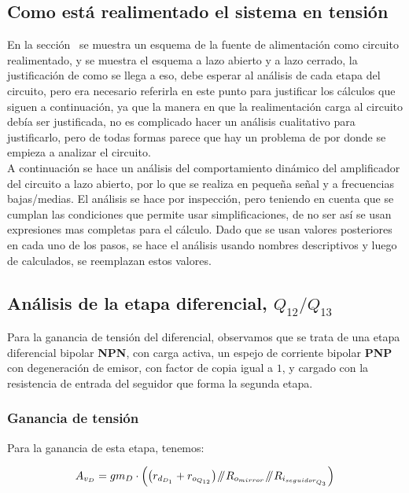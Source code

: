 
\subsection{Como está realimentado el sistema en tensión}

En la sección~ se muestra un esquema de la fuente de alimentación como circuito realimentado, y se muestra el esquema a lazo abierto y a lazo cerrado, la justificación de como se llega a eso, debe esperar al análisis de cada etapa del circuito, pero era necesario referirla en este punto para justificar los cálculos que siguen a continuación, ya que la manera en que la realimentación carga al circuito debía ser justificada, no es complicado hacer un análisis cualitativo para justificarlo, pero de todas formas parece que hay un problema de por donde se empieza a analizar el circuito.\\


A continuación se hace un análisis del comportamiento dinámico del amplificador del circuito a lazo abierto, por lo que se realiza en pequeña señal y a frecuencias bajas/medias.
El análisis se hace por inspección, pero teniendo en cuenta que se cumplan las condiciones que permite usar simplificaciones, de no ser así se usan expresiones mas completas para el cálculo. Dado que se usan valores posteriores en cada uno de los pasos, se hace el análisis usando nombres descriptivos y luego de calculados, se reemplazan estos valores.

\subsection{Análisis de la etapa diferencial, $Q_{12}/Q_{13}$}

Para la ganancia de tensión del diferencial, observamos que se trata de una etapa diferencial bipolar \textbf{NPN}, con carga activa, un espejo de corriente bipolar \textbf{PNP} con degeneración de emisor, con factor de copia igual a $1$, y cargado con la resistencia de entrada del seguidor que forma la segunda etapa.\\

\subsubsection{Ganancia de tensión}

Para la ganancia de esta etapa, tenemos:

\begin{equation}
A_{v_{D}} = gm_{D} \cdot \left( \left(  r_{d_{D_{1}}} + r_{o_{Q_{12}}} \right) \mathbin{\!/\mkern-5mu/\!}  R_{o_{mirror}} \mathbin{\!/\mkern-5mu/\!} R_{i_{seguidor_{Q_{3}}}} \right)
\end{equation}


